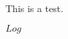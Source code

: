 \documentclass{article}
\begin{document}
This is a test.


\begin{rcslog}
$Log$
\end{rcslog}
\end{document}
